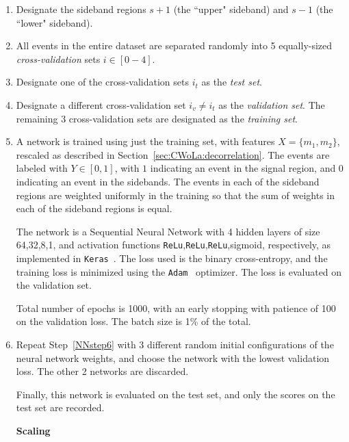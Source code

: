 \begin{enumerate}
  \item Designate the sideband regions $s+1$ (the ``upper" sideband) and $s-1$ (the ``lower" sideband). 
  \label{NNstep2}
  \item All events in the entire dataset are separated randomly into 5 equally-sized \textit{cross-validation} sets $i \in [0-4]$.
  \label{NNstep1}
  \item Designate one of the cross-validation sets $i_t$ as the \textit{test set}.
  \label{NNstep3}
  \item Designate a different cross-validation set $i_v \ne i_t$ as the \textit{validation set}. The remaining 3 cross-validation sets are designated as the \textit{training set}.
  \label{NNstep5}
  \item A network is trained using just the training set, with features $X = \{m_1,m_2\}$, rescaled as described in Section~\ref{sec:CWoLa:decorrelation}. The events are labeled with $Y \in [0,1]$, with $1$ indicating an event in the signal region, and $0$ indicating an event in the sidebands. The events in each of the sideband regions are weighted uniformly in the training so that the sum of weights in each of the sideband regions is equal.

  The network is a Sequential Neural Network with 4 hidden layers of size 64,32,8,1, and activation functions \texttt{ReLu},\texttt{ReLu},\texttt{ReLu},sigmoid, respectively, as implemented in \texttt{Keras}~\cite{chollet2015keras}.
  The loss used is the binary cross-entropy, and the training loss is minimized using the \texttt{Adam}~\cite{kingma2014adam} optimizer.
  The loss is evaluated on the validation set.
  
  Total number of epochs is 1000, with an early stopping with patience of 100 on the validation loss. The batch size is 1\% of the total.

  
  \label{NNstep6}
  \item Repeat Step~\ref{NNstep6} with 3 different random initial configurations of the neural network weights, and choose the network with the lowest validation loss. The other 2 networks are discarded.
  \label{NNstep7}

  Finally, this network is evaluated on the test set, and only the scores on the test set are recorded.

  \textbf{Scaling}
  \label{NNstep7scaling}


\end{enumerate}
